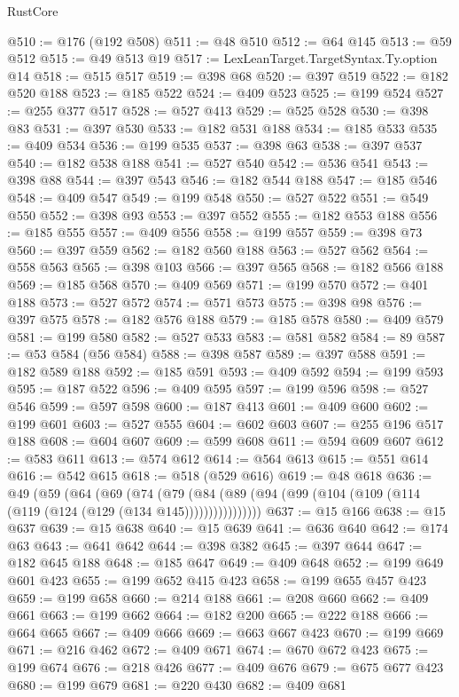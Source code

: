 \begin{lexlean}{RustCore}
\begin{coremodule}
@510 := @176 (@192 @508)
@511 := @48 @510
@512 := @64 @145
@513 := @59 @512
@515 := @49 @513 @19
@517 := LexLeanTarget.TargetSyntax.Ty.option @14
@518 := @515 @517
@519 := @398 @68
@520 := @397 @519
@522 := @182 @520 @188
@523 := @185 @522
@524 := @409 @523
@525 := @199 @524
@527 := @255 @377 @517
@528 := @527 @413
@529 := @525 @528
@530 := @398 @83
@531 := @397 @530
@533 := @182 @531 @188
@534 := @185 @533
@535 := @409 @534
@536 := @199 @535
@537 := @398 @63
@538 := @397 @537
@540 := @182 @538 @188
@541 := @527 @540
@542 := @536 @541
@543 := @398 @88
@544 := @397 @543
@546 := @182 @544 @188
@547 := @185 @546
@548 := @409 @547
@549 := @199 @548
@550 := @527 @522
@551 := @549 @550
@552 := @398 @93
@553 := @397 @552
@555 := @182 @553 @188
@556 := @185 @555
@557 := @409 @556
@558 := @199 @557
@559 := @398 @73
@560 := @397 @559
@562 := @182 @560 @188
@563 := @527 @562
@564 := @558 @563
@565 := @398 @103
@566 := @397 @565
@568 := @182 @566 @188
@569 := @185 @568
@570 := @409 @569
@571 := @199 @570
@572 := @401 @188
@573 := @527 @572
@574 := @571 @573
@575 := @398 @98
@576 := @397 @575
@578 := @182 @576 @188
@579 := @185 @578
@580 := @409 @579
@581 := @199 @580
@582 := @527 @533
@583 := @581 @582
@584 := 89
@587 := @53 @584 (@56 @584)
@588 := @398 @587
@589 := @397 @588
@591 := @182 @589 @188
@592 := @185 @591
@593 := @409 @592
@594 := @199 @593
@595 := @187 @522
@596 := @409 @595
@597 := @199 @596
@598 := @527 @546
@599 := @597 @598
@600 := @187 @413
@601 := @409 @600
@602 := @199 @601
@603 := @527 @555
@604 := @602 @603
@607 := @255 @196 @517 @188
@608 := @604 @607
@609 := @599 @608
@611 := @594 @609 @607
@612 := @583 @611
@613 := @574 @612
@614 := @564 @613
@615 := @551 @614
@616 := @542 @615
@618 := @518 (@529 @616)
@619 := @48 @618
@636 := @49
    (@59
      (@64
        (@69
          (@74
            (@79 (@84 (@89 (@94 (@99 (@104 (@109 (@114 (@119 (@124 (@129 (@134 @145))))))))))))))))
@637 := @15 @166
@638 := @15 @637
@639 := @15 @638
@640 := @15 @639
@641 := @636 @640
@642 := @174 @63
@643 := @641 @642
@644 := @398 @382
@645 := @397 @644
@647 := @182 @645 @188
@648 := @185 @647
@649 := @409 @648
@652 := @199 @649 @601 @423
@655 := @199 @652 @415 @423
@658 := @199 @655 @457 @423
@659 := @199 @658
@660 := @214 @188
@661 := @208 @660
@662 := @409 @661
@663 := @199 @662
@664 := @182 @200
@665 := @222 @188
@666 := @664 @665
@667 := @409 @666
@669 := @663 @667 @423
@670 := @199 @669
@671 := @216 @462
@672 := @409 @671
@674 := @670 @672 @423
@675 := @199 @674
@676 := @218 @426
@677 := @409 @676
@679 := @675 @677 @423
@680 := @199 @679
@681 := @220 @430
@682 := @409 @681

\end{coremodule}
\end{lexlean}
